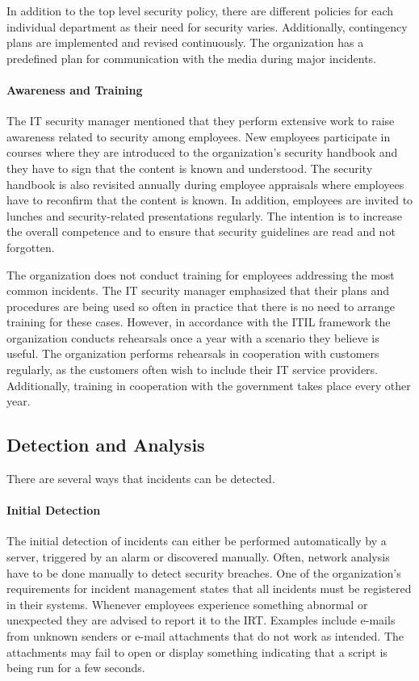 In addition to the top level security policy, there are different policies for each individual department as their need for security varies. Additionally, contingency plans are implemented and revised continuously. The organization has a predefined plan for communication with the media during major incidents. 

\paragraph{Awareness and Training}
The IT security manager mentioned that they perform extensive work to raise awareness related to security among employees. New employees participate in courses where they are introduced to the organization's security handbook and they have to sign that the content is known and understood. The security handbook is also revisited annually during employee appraisals where employees have to reconfirm that the content is known. In addition, employees are invited to lunches and security-related presentations regularly. The intention is to increase the overall competence and to ensure that security guidelines are read and not forgotten.

The organization does not conduct training for employees addressing the most common incidents. The IT security manager emphasized that their plans and procedures are being used so often in practice that there is no need to arrange training for these cases. However, in accordance with the ITIL framework the organization conducts rehearsals once a year with a scenario they believe is useful. The organization performs rehearsals in cooperation with customers regularly, as the customers often wish to include their IT service providers. Additionally, training in cooperation with the government takes place every other year. 

\subsection{Detection and Analysis}
There are several ways that incidents can be detected.
\paragraph{Initial Detection}
The initial detection of incidents can either be performed automatically by a server, triggered by an alarm or discovered manually. Often, network analysis have to be done manually to detect security breaches. One of the organization's requirements for incident management states that all incidents must be registered in their systems. Whenever employees experience something abnormal or unexpected they are advised to report it to the \ac{IRT}. Examples include e-mails from unknown senders or e-mail attachments that do not work as intended. The attachments may fail to open or display something indicating that a script is being run for a few seconds.

